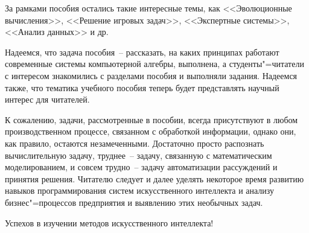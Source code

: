 \documentclass[a4paper,14pt, openany, twoside, draft]{extbook} %
\begin{document}
За рамками пособия остались такие интересные темы, как <<Эволюционные вычисления>>, <<Решение игровых задач>>, <<Экспертные системы>>, <<Анализ данных>> и др.

Надеемся, что задача пособия~-- рассказать, на каких принципах работают современные системы компьютерной алгебры, выполнена, а студенты"=читатели с интересом знакомились с разделами пособия и выполняли задания.  Надеемся также, что тематика учебного пособия теперь будет представлять научный интерес для читателей.

К сожалению, задачи, рассмотренные в пособии, всегда присутствуют в любом производственном процессе, связанном с обработкой информации, однако они, как правило, остаются незамеченными.  Достаточно просто распознать вычислительную задачу, труднее~-- задачу, связанную с математическим моделированием, и совсем трудно~-- задачу автоматизации рассуждений и принятия решения.  Читателю следует и далее уделять некоторое время развитию навыков программирования систем искусственного интеллекта и анализу бизнес"=процессов предприятия и выявлению этих необычных задач.

Успехов в изучении методов искусственного интеллекта!
\end{document}

